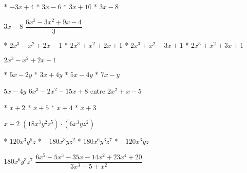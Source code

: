\begin{enum}
	* $-3x+4$
	* $3x-6$
	* $3x+10$
	* $3x-8$
\end{enum}
$3x-8$
$\dfrac{6x^3-3x^2+9x-4}{3}$
\begin{enum}
	* $2x^3-x^2+2x-1$
	* $2x^3+x^2+2x+1$
	* $2x^3+x^2-3x+1$
	* $2x^3+x^2+3x+1$
\end{enum}
$2x^3-x^2+2x-1$
\begin{enum}
	* $5x-2y$
	* $3x+4y$
	* $5x-4y$
	* $7x-y$
\end{enum}
$5x-4y$
$6x^3-2x^2-15x+8$ entre $2x^2+x-5$
\begin{enum}
	* $x+2$
	* $x+5$
	* $x+4$
	* $x+3$
\end{enum}
$x+2$
$\left(18x^3y^2z^5\right)\cdot\left(6x^3yz^2\right)$
\begin{enum}
	* $120x^3y^5z$
	* $-180x^3yz^2$
	* $180x^6y^3z^7$
	* $-120x^3yz$
\end{enum}
$180x^6y^3z^7$
$\dfrac{6x^5-5x^3-35x-14x^2+23x^4+20}{3x^3-5+x^2}$

